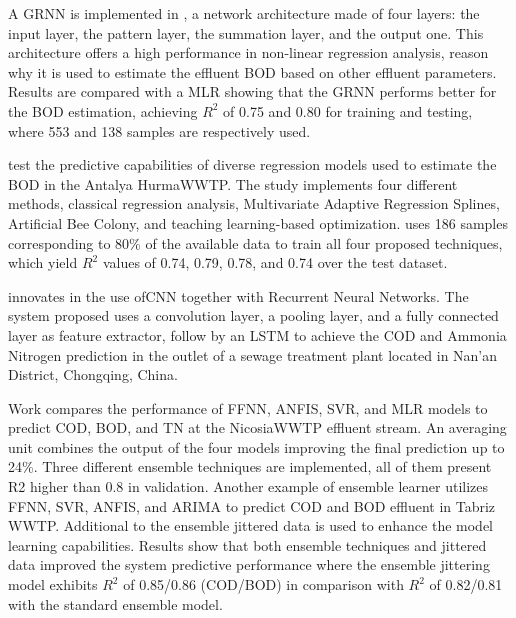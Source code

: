 A \ac{GRNN} is implemented in \cite{Heddam2016}, a network architecture made of four layers: the input layer, the pattern layer, the summation layer, and the output one. This architecture offers a high performance in non-linear regression analysis, reason why it is used to estimate the effluent BOD based on other effluent parameters. Results are compared with a \ac{MLR} showing that the GRNN performs better for the BOD estimation, achieving \begin{math}R^2\end{math} of 0.75 and 0.80 for training and testing, where 553 and 138 samples are respectively used. 

\cite{Baki2019} test the predictive capabilities of diverse regression models used to estimate the BOD in the Antalya Hurma\ac{WWTP}. The study implements four different methods, classical regression analysis, Multivariate Adaptive Regression Splines, Artificial Bee Colony, and teaching learning-based optimization. \cite{Baki2019} uses 186 samples corresponding to 80\% of the available data to train all four proposed techniques, which yield \begin{math}R^2\end{math} values of 0.74, 0.79, 0.78, and 0.74 over the test dataset.

\cite{Guo2020} innovates in the use of\ac{CNN} together with Recurrent Neural Networks. The system proposed  uses a convolution layer, a pooling layer, and a fully connected layer as feature extractor, follow by an \ac{LSTM} to achieve the \ac{COD} and Ammonia Nitrogen prediction in the outlet of a sewage treatment plant located in Nan'an District, Chongqing, China.

Work \cite{Nourani2018} compares the performance of \ac{FFNN}, \ac{ANFIS}, \ac{SVR}, and \ac{MLR} models to predict \ac{COD}, BOD, and \ac{TN} at the Nicosia\ac{WWTP} effluent stream. An averaging unit combines the output of the four models improving the final prediction up to 24\%. Three different ensemble techniques are implemented, all of them present R2 higher than 0.8 in validation. Another example of ensemble learner \cite{Nourani2021} utilizes \ac{FFNN}, \ac{SVR}, \ac{ANFIS}, and \ac{ARIMA} to predict \ac{COD} and BOD effluent in Tabriz \ac{WWTP}. Additional to the ensemble jittered data is used to enhance the model learning capabilities. Results show that both ensemble techniques and jittered data improved the system predictive performance where the ensemble jittering model exhibits \begin{math}R^2\end{math} of 0.85/0.86 (\ac{COD}/\ac{BOD}) in comparison with \begin{math}R^2\end{math} of 0.82/0.81 with the standard ensemble model.  

